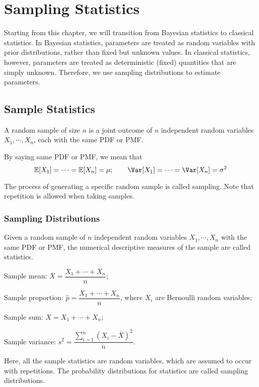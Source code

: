 \chapter{Sampling Statistics}

Starting from this chapter, we will transition from Bayesian statistics to classical statistics. In Bayesian statistics, parameters are treated as random variables with prior distributions, rather than fixed but unknown values. In classical statistics, however, parameters are treated as deterministic (fixed) quantities that are simply unknown. Therefore, we use sampling distributions to estimate parameters.

\section{Sample Statistics}
A random sample of size \(n\) is a joint outcome of \(n\) independent random variables \(X_1, \cdots, X_n\), each with the same PDF or PMF. 
\begin{remark}
  By saying same PDF or PMF, we mean that 
  \[
    \mathbb{E}[X_1] = \cdots = \mathbb{E}[X_n] = \mu; \quad\quad \Var[X_1] = \cdots = \Var[X_n] = \sigma^2
  \]
\end{remark}

The process of generating a specific random sample is called sampling. Note that repetition is allowed when taking samples.

\subsection{Sampling Distributions}
Given a random sample of \(n\) independent random variables \(X_1, \cdots, X_n\) with the same PDF or PMF, the numerical descriptive measures of the sample are called statistics. 

Sample mean: \(\overline{X} = \dfrac{X_1 + \cdots + X_n}{n}\); 

Sample proportion: \(\hat{p} = \dfrac{X_1 + \cdots + X_n}{n}\), where \(X_i\) are Bernoulli random variables; 

Sample sum: \(X = X_1 + \cdots + X_n\); 

Sample variance: \(s^2 = \dfrac{\sum_{i = 1}^n (X_i - \overline{X})^2}{n}\). 

Here, all the sample statistics are random variables, which are assumed to occur with repetitions. The probability distributions for statistics are called sampling distributions.

